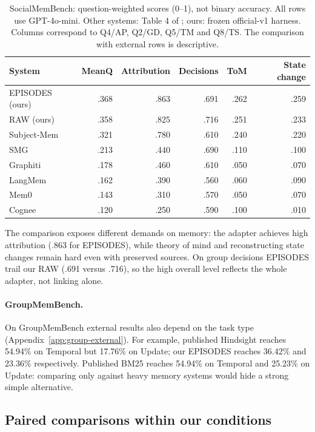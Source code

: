 \documentclass[11pt,a4paper]{article}
\newcommand{\raw}{RAW}
\newcommand{\episodes}{EPISODES}
\begin{document}
\begin{table}[ht]
\centering\small
\begin{tabular}{@{}lrrrrr@{}}
\toprule
System & MeanQ & Attribution & Decisions & ToM & State change\\
\midrule
\episodes{} (ours) & .368 & .863 & .691 & .262 & .259\\
\raw{} (ours) & .358 & .825 & .716 & .251 & .233\\
\midrule
Subject-Mem & .321 & .780 & .610 & .240 & .220\\
SMG & .213 & .440 & .690 & .110 & .100\\
Graphiti & .178 & .460 & .610 & .050 & .070\\
LangMem & .162 & .390 & .560 & .060 & .090\\
Mem0 & .143 & .310 & .570 & .050 & .070\\
Cognee & .120 & .250 & .590 & .100 & .010\\
\bottomrule
\end{tabular}
\caption{SocialMemBench: question-weighted scores (0--1), not binary accuracy. All
rows use GPT-4o-mini. Other systems: Table 4 of \citep{owolabi2026}; ours: frozen
official-v1 harness. Columns correspond to Q4/AP, Q2/GD, Q5/TM and Q8/TS. The
comparison with external rows is descriptive.}
\label{tab:social-external}
\end{table}

The comparison exposes different demands on memory: the adapter achieves high
attribution (.863 for \episodes{}), while theory of mind and reconstructing state
changes remain hard even with preserved sources. On group decisions \episodes{} trail
our \raw{} (.691 versus .716), so the high overall level reflects the whole adapter,
not linking alone.

\paragraph{GroupMemBench.}
On GroupMemBench external results also depend on the task type
(Appendix~\ref{app:group-external}). For example, published Hindsight reaches
54.94\% on Temporal but 17.76\% on Update; our EPISODES reaches 36.42\% and 23.36\%
respectively. Published BM25 reaches 54.94\% on Temporal and 25.23\% on Update:
comparing only against heavy memory systems would hide a strong simple
alternative.

\subsection{Paired comparisons within our conditions}
\label{sec:paired}
\end{document}

